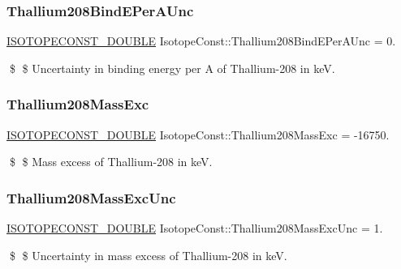 \subsubsection{\texorpdfstring{Thallium208\+Bind\+E\+Per\+A\+Unc}{Thallium208BindEPerAUnc}}
{\footnotesize\ttfamily \mbox{\hyperlink{group___isotope_const-_macros_ga8f45a7272ce02c0b4c65c44636ed719a}{I\+S\+O\+T\+O\+P\+E\+C\+O\+N\+S\+T\+\_\+\+D\+O\+U\+B\+LE}} Isotope\+Const\+::\+Thallium208\+Bind\+E\+Per\+A\+Unc = 0.}

\$ \$ Uncertainty in binding energy per A of Thallium-\/208 in keV. \mbox{\label{group___isotope_const-_thallium-_tl208_ga3e84274539aa7af3cf212e93bc9e8679}} 
\subsubsection{\texorpdfstring{Thallium208\+Mass\+Exc}{Thallium208MassExc}}
{\footnotesize\ttfamily \mbox{\hyperlink{group___isotope_const-_macros_ga8f45a7272ce02c0b4c65c44636ed719a}{I\+S\+O\+T\+O\+P\+E\+C\+O\+N\+S\+T\+\_\+\+D\+O\+U\+B\+LE}} Isotope\+Const\+::\+Thallium208\+Mass\+Exc = -\/16750.}

\$ \$ Mass excess of Thallium-\/208 in keV. \mbox{\label{group___isotope_const-_thallium-_tl208_gae08fbc91764ee0546cc4e447fd818bf6}} 
\subsubsection{\texorpdfstring{Thallium208\+Mass\+Exc\+Unc}{Thallium208MassExcUnc}}
{\footnotesize\ttfamily \mbox{\hyperlink{group___isotope_const-_macros_ga8f45a7272ce02c0b4c65c44636ed719a}{I\+S\+O\+T\+O\+P\+E\+C\+O\+N\+S\+T\+\_\+\+D\+O\+U\+B\+LE}} Isotope\+Const\+::\+Thallium208\+Mass\+Exc\+Unc = 1.}

\$ \$ Uncertainty in mass excess of Thallium-\/208 in keV. \mbox{\label{group___isotope_const-_thallium-_tl208_ga501b4b0a56fdb9ef94f00ee313a59b7d}} 
